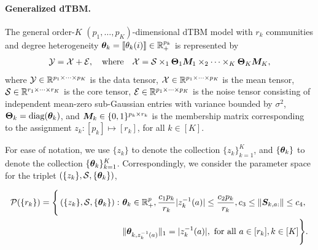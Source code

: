 \documentclass[lettersize,journal]{IEEEtran}
\theoremstyle{definition}
\theoremstyle{definition}
\newcommand{\of}[1]{\left(#1\right)}
\newcommand{\offf}[1]{\left\{#1\right\}}
\begin{document}
 \paragraph{Generalized dTBM.} 
 
 The general order-$K$ $(p_1, \ldots, p_K)$-dimensional dTBM model with $r_k$ communities and degree heterogeneity $\boldsymbol{\theta}_k = \llbracket \theta_k(i) \rrbracket \in \mathbb{R}_+^{p_k}$ is represented by
\begin{equation}\label{eq:general_dtbm}
    \tY = \tX+ \tE,\quad \text{where}\quad \tX=\tS \times_1 \mTheta_1 \mM_1 \times_2 \cdots \times_K \mTheta_K \mM_K,
\end{equation}
where $\mathcal{Y} \in \mathbb{R}^{p_1 \times \cdots \times p_K}$ is the data tensor, $\mathcal{X}\in \mathbb{R}^{p_1\times \cdots \times p_K}$ is the mean tensor, $\mathcal{S} \in \mathbb{R}^{r_1 \times \cdots \times r_K}$ is the core tensor, $\mathcal{E} \in \mathbb{R}^{p_1 \times \cdots \times p_K}$ is the noise tensor consisting of independent mean-zero sub-Gaussian entries with variance bounded by $\sigma^2$, $\boldsymbol{\Theta}_k = \text{diag}(\boldsymbol{\theta}_k)$, and $\bm M_k\in \{0,1\}^{p_k \times r_k}$ is the membership matrix corresponding to the assignment $z_k: [p_k] \mapsto [r_k]$, for all $k \in [K]$. 

For ease of notation, we use $\{z_k\}$ to denote the collection $\{z_k\}_{k=1}^K$, and $\{\boldsymbol{\theta}_k\}$ to denote the collection $\{\boldsymbol{\theta}_k\}_{k=1}^K$. Correspondingly, we consider the parameter space for the triplet $\of{\{z_k\}, \tS, \{\mtheta_k\}}$,

\begin{align}
    \tP(\{r_k\}) = \Bigg\{ \of{\{z_k\}, \tS, \{\mtheta_k\}}:\  &\mtheta_k \in\mathbb{R}^p_{+}, {c_1 p_k\over r_k} |z_k^{-1}(a)| \leq {c_2 p_k\over r_k}, c_3 \leq  \onorm{\mS_{k,a:}} \leq c_4 ,\\
    &\onormSize{}{\mtheta_{k,z_k^{-1}(a)}}_1=|z_k^{-1}(a)|, \text{ for all } a \in [r_k], k\in[K]\Bigg\}. \label{eq:general_family}
\end{align}
\end{document}
